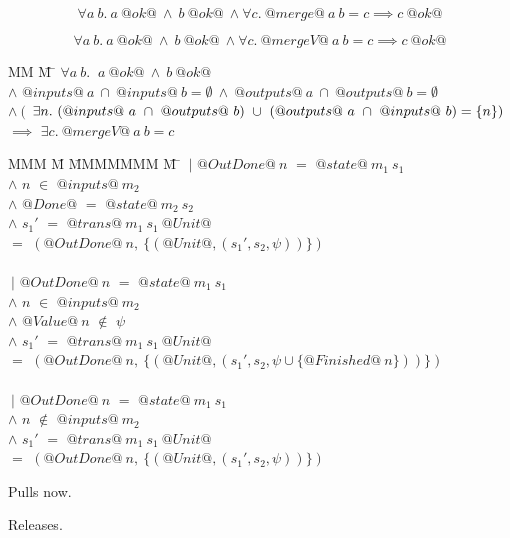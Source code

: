 $$
\forall a~b.\ a~@ok@~\wedge~b~@ok@~\wedge \forall c.\ @merge@~a~b = c \implies c~@ok@
$$

$$
\forall a~b.\ a~@ok@~\wedge~b~@ok@~\wedge \forall c.\ @mergeV@~a~b = c \implies c~@ok@
$$

\begin{tabbing}
MM \= M \= \kill
$ \forall a~b.\ $ \> \>
$a~@ok@~\wedge~b~@ok@$ \\
\> $\wedge$ \> $@inputs@~a~\cap~@inputs@~b=\emptyset~\wedge~@outputs@~a~\cap~@outputs@~b=\emptyset$ \\
\> $\wedge~($ \> $\exists n.\ (@inputs@~a~\cap~@outputs@~b)~\cup~(@outputs@~a~\cap~@inputs@~b) = \sgl{n})$ \\
 $\implies$ \> \> $\exists c.\ @mergeV@~a~b=c$
\end{tabbing}

\begin{tabbing}
MMM \= M \= MMMMMMM \= M \=\kill
 \> $~|$ \> $@OutDone@~n$ \> $=$ \> $@state@~m_1~s_1$ \\
 \> $\wedge$ \> $n$      \> $\in$ \> $@inputs@~m_2$ \\
 \> $\wedge$ \> $@Done@$ \> $=$ \> $@state@~m_2~s_2$ \\
 \> $\wedge$ \> $s_1'$     \> $=$ \> $@trans@~m_1~s_1~@Unit@$ \\
 \> $=$ \> $(@OutDone@~n,~\{(@Unit@, (s_1',s_2,\psi))\})$ \\
 \\
 \> $~|$ \> $@OutDone@~n$ \> $=$ \> $@state@~m_1~s_1$ \\
 \> $\wedge$ \> $n$      \> $\in$ \> $@inputs@~m_2$ \\
 \> $\wedge$ \> $@Value@~n$ \> $\not\in$ \> $\psi$ \\
 \> $\wedge$ \> $s_1'$     \> $=$ \> $@trans@~m_1~s_1~@Unit@$ \\
 \> $=$ \> $(@OutDone@~n,~\{(@Unit@, (s_1',s_2,\psi \cup \{@Finished@~n\}))\})$ \\
 \\
 \> $~|$ \> $@OutDone@~n$ \> $=$ \> $@state@~m_1~s_1$ \\
 \> $\wedge$ \> $n$      \> $\not\in$ \> $@inputs@~m_2$ \\
 \> $\wedge$ \> $s_1'$     \> $=$ \> $@trans@~m_1~s_1~@Unit@$ \\
 \> $=$ \> $(@OutDone@~n,~\{(@Unit@, (s_1',s_2,\psi))\})$ \\
\end{tabbing}

Pulls now.

Releases.

